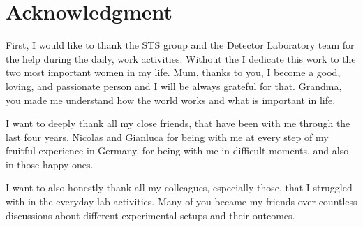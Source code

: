 \chapter{Acknowledgment}
\vspace{2cm}
\vspace{2cm}



First, I would like to thank the STS group and the Detector Laboratory team for the help during the daily, work activities. Without the 
I dedicate this work to the two most important women in my life. Mum, thanks to you, I become a good, loving, and passionate person and I will be always grateful for that. Grandma, you made me understand how the world works and what is important in life. 

I want to deeply thank all my close friends, that have been with me through the last four years. Nicolas and Gianluca for being with me at every step of my fruitful experience in Germany, for being with me in difficult moments, and also in those happy ones.

I want to also honestly thank all my colleagues, especially those, that I struggled with in the everyday lab activities. Many of you became my friends over countless discussions about different experimental setups and their outcomes. 


